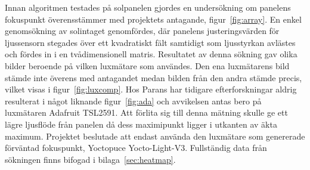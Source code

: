             Innan algoritmen testades på solpanelen gjordes en undersökning om panelens fokuspunkt överensstämmer med projektets antagande, figur~\ref{fig:array}. 
            En enkel genomsökning av solintaget genomfördes, där panelens justeringsvärden för ljussensorn stegades över ett kvadratiskt fält samtidigt som ljusstyrkan avlästes och fördes in i en tvådimensionell matris.
            Resultatet av denna sökning gav olika bilder beroende på vilken luxmätare som användes. Den ena luxmätarens bild stämde inte överens med antagandet medan bilden från den andra stämde precis, vilket visas i figur~\ref{fig:luxcomp}.
            Hos Parans har tidigare efterforskningar aldrig resulterat i något liknande figur~\ref{fig:ada} och avvikelsen antas bero på luxmätaren Adafruit TSL2591. Att förlita sig till denna mätning skulle ge ett lägre ljusflöde från panelen då dess maximipunkt ligger i utkanten av äkta maximum.
            Projektet beslutade att endast använda den luxmätare som genererade förväntad fokuspunkt, Yoctopuce Yocto-Light-V3.
            Fullständig data från sökningen finns bifogad i bilaga~\ref{sec:heatmap}.

